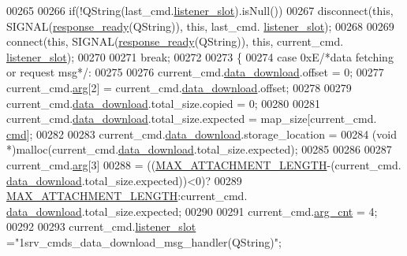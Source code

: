 \begin{DoxyCode}
00265 
00266             \textcolor{keywordflow}{if}(!QString(last\_cmd.\hyperlink{a00004_abb76d8edb39876deb60975c8fd784b3f}{listener\_slot}).isNull())
00267             disconnect(\textcolor{keyword}{this}, SIGNAL(\hyperlink{a00017_a3f6396874778799cf07a7a0149e54977}{response\_ready}(QString)), \textcolor{keyword}{this}, last\_cmd.
      \hyperlink{a00004_abb76d8edb39876deb60975c8fd784b3f}{listener\_slot});
00268 
00269             connect(\textcolor{keyword}{this}, SIGNAL(\hyperlink{a00017_a3f6396874778799cf07a7a0149e54977}{response\_ready}(QString)), \textcolor{keyword}{this}, current\_cmd.
      \hyperlink{a00004_abb76d8edb39876deb60975c8fd784b3f}{listener\_slot});
00270 
00271         \textcolor{keywordflow}{break};
00272 
00273    \{
00274     \textcolor{keywordflow}{case} 0xE\textcolor{comment}{/*data fetching or request msg*/}:
00275 
00276             current\_cmd.\hyperlink{a00004_a5cfeaed4d4f8e51070a324c0ba893ebe}{data\_download}.offset = 0;
00277             current\_cmd.\hyperlink{a00004_a56e6c2d7315d0ae60a51e8b140c9cfe4}{arg}[2] = current\_cmd.\hyperlink{a00004_a5cfeaed4d4f8e51070a324c0ba893ebe}{data\_download}.offset;
00278 
00279             current\_cmd.\hyperlink{a00004_a5cfeaed4d4f8e51070a324c0ba893ebe}{data\_download}.total\_size.copied = 0;
00280 
00281             current\_cmd.\hyperlink{a00004_a5cfeaed4d4f8e51070a324c0ba893ebe}{data\_download}.total\_size.expected = map\_size[current\_cmd.
      \hyperlink{a00004_af20664dc9ca2b752c73d524edee0e07a}{cmd}];
00282 
00283             current\_cmd.\hyperlink{a00004_a5cfeaed4d4f8e51070a324c0ba893ebe}{data\_download}.storage\_location =
00284                     (\textcolor{keywordtype}{void} *)malloc(current\_cmd.\hyperlink{a00004_a5cfeaed4d4f8e51070a324c0ba893ebe}{data\_download}.total\_size.expected);
00285 
00286 
00287             current\_cmd.\hyperlink{a00004_a56e6c2d7315d0ae60a51e8b140c9cfe4}{arg}[3]
00288                     = ((\hyperlink{a00086_aa8abe3a822c64813f7aaba3ca7e3db9c}{MAX\_ATTACHMENT\_LENGTH}-(current\_cmd.
      \hyperlink{a00004_a5cfeaed4d4f8e51070a324c0ba893ebe}{data\_download}.total\_size.expected))<0)?
00289                         \hyperlink{a00086_aa8abe3a822c64813f7aaba3ca7e3db9c}{MAX\_ATTACHMENT\_LENGTH}:current\_cmd.
      \hyperlink{a00004_a5cfeaed4d4f8e51070a324c0ba893ebe}{data\_download}.total\_size.expected;
00290 
00291             current\_cmd.\hyperlink{a00004_affcea772a1bc5362ebbc274b6166f81b}{arg\_cnt}    = 4;
00292 
00293             current\_cmd.\hyperlink{a00004_abb76d8edb39876deb60975c8fd784b3f}{listener\_slot} =\textcolor{stringliteral}{"1srv\_cmds\_data\_download\_msg\_handler(QString)"};

\end{DoxyCode}
